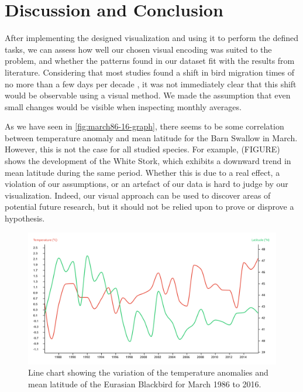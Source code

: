 \documentclass[journal]{vgtc}                %
\begin{document}
\section{Discussion and Conclusion}


After implementing the designed visualization and using it to perform the defined tasks, we can assess how well our chosen visual encoding was suited to the problem, and whether the patterns found in our dataset fit with the results from literature. Considering that most studies found a shift in bird migration times of no more than a few days per decade \cite{cotton2003avian}, it was not immediately clear that this shift would be observable using a visual method. We made the assumption that even small changes would be visible when inspecting monthly averages.

As we have seen in \autoref{fig:march86-16-graph}, there seems to be some correlation between temperature anomaly and mean latitude for the Barn Swallow in March. However, this is not the case for all studied species. For example, (FIGURE) shows the development of the White Stork, which exhibits a downward trend in mean latitude during the same period. Whether this is due to a real effect, a violation of our assumptions, or an artefact of our data is hard to judge by our visualization. Indeed, our visual approach can be used to discover areas of potential future research, but it should not be relied upon to prove or disprove a hypothesis.

\begin{figure}[t]
  \centering
  \includegraphics[width=\linewidth]{march86-16-graph-eurbla}
  \caption{Line chart showing the variation of the temperature anomalies and mean latitude of the Eurasian Blackbird for March 1986 to 2016.}
  \label{fig:march86-16-graph-eurbla}
\end{figure}
\end{document}
